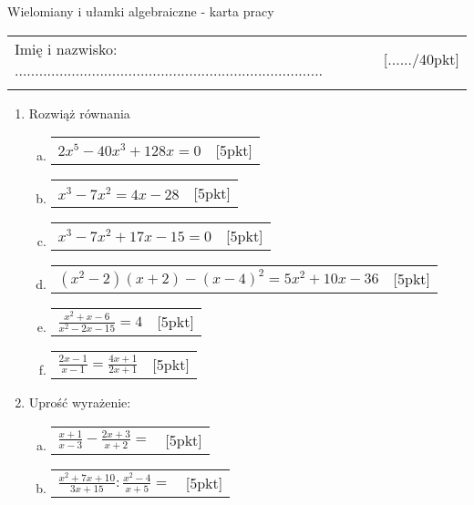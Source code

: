 \documentclass[12pt,a4paper]{article}
\begin{document}
	\begin{center}
		\LARGE Wielomiany i ułamki algebraiczne - karta pracy
	\end{center}
	\vspace{1.5cm}

	\begin{tabular}{p{13cm} r}
		Imię i nazwisko: ............................................................................
		&[....../40pkt]\\ 
		\vspace{0.5cm} 
		
	\end{tabular}
	\begin{enumerate}[1.]\large	
		\item  Rozwiąż równania
		\begin{enumerate}[a)]
			\item \begin{tabular}{p{13cm} r}
				$2x^5-40x^3+128x=0$&[5pkt]\\ 
			\end{tabular}
			\item  \begin{tabular}{p{13cm} r}
				$x^3-7x^2=4x-28$&[5pkt]\\ 
			\end{tabular}
			\item  \begin{tabular}{p{13cm} r}
				$x^3-7x^2+17x-15=0$&[5pkt]\\ 
			\end{tabular}
			\item  \begin{tabular}{p{13cm} r}
				$(x^2-2)(x+2)-(x-4)^2=5x^2+10x-36$&[5pkt]\\ 
			\end{tabular}
			\item  \begin{tabular}{p{13cm} r}
				$\frac{x^2+x-6}{x^2-2x-15}=4$&[5pkt]\\ 
			\end{tabular}
			\item  \begin{tabular}{p{13cm} r}
				$\frac{2x-1}{x-1}=\frac{4x+1}{2x+1}$&[5pkt]\\ 
			\end{tabular}
		\end{enumerate}
		
		\item Uprość wyrażenie:
		
		\begin{enumerate}[a)]
			\item  \begin{tabular}{p{13cm} r}
				$\frac{x+1}{x-3}-\frac{2x+3}{x+2}=$&[5pkt]\\ 
			\end{tabular}
			\item  \begin{tabular}{p{13cm} r}
				$\frac{x^2+7x+10}{3x+15}:\frac{x^2-4}{x+5}=$&[5pkt]\\ 
			\end{tabular}
		\end{enumerate}
		
		
		
		
		
	\end{enumerate}
	
\end{document}
